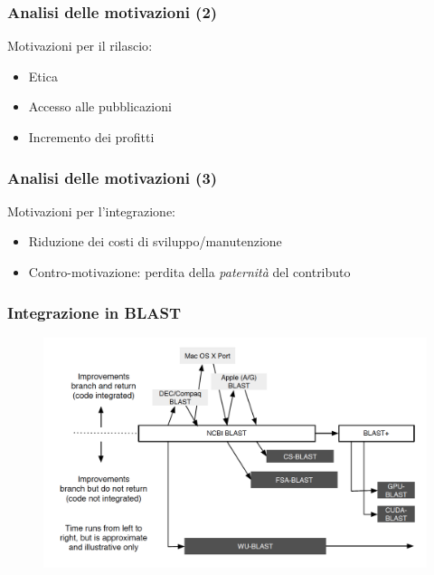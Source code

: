 \begin{frame}\frametitle{Analisi delle motivazioni (2)}

\Large{Motivazioni per il \alert{rilascio}:}

\begin{itemize}[<+->]
\itemsep1pt\parskip0pt
\item
  Etica
\item
  Accesso alle pubblicazioni
\item
  Incremento dei profitti
\end{itemize}

\end{frame}

\begin{frame}\frametitle{Analisi delle motivazioni (3)}

\Large{Motivazioni per l'\alert{integrazione}:}

\begin{itemize}[<+->]
\itemsep1pt\parskip0pt
\item
  Riduzione dei costi di sviluppo/manutenzione
\item
  \alert{Contro-motivazione:} perdita della \emph{paternità} del
  contributo
\end{itemize}

\end{frame}

\begin{frame}\frametitle{Integrazione in BLAST}

\begin{figure}
\begin{center}
    \includegraphics[scale=.25]{img/integration_blast}
\end{center}
\end{figure}


\end{frame}


